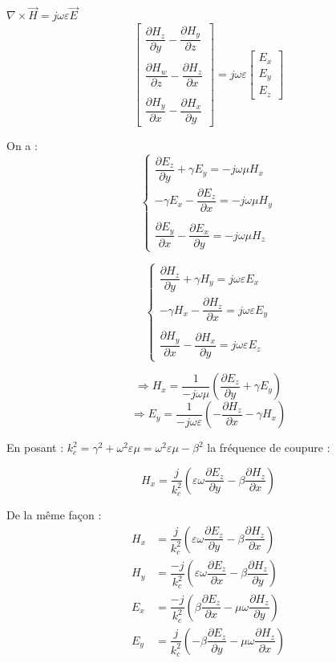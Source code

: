 \documentclass[12pt,a4paper]{report}
\begin{document}
\(\nabla \times \vec{H} = j\omega \varepsilon \vec{E}\)
\[
	\left[
	\begin{array}{c}
		\dfrac{\partial H_z}{\partial y} - \dfrac{\partial H_y}{\partial z}\\\\
		\dfrac{\partial H_w}{\partial z} - \dfrac{\partial H_z}{\partial x}\\\\
		\dfrac{\partial H_y}{\partial x} - \dfrac{\partial H_x}{\partial y}
	\end{array}
	\right]
	= j\omega \varepsilon
	\left[
	\begin{array}{c}
		E_x\\
		E_y\\
		E_z
	\end{array}
	 \right]
\]

On a :
\[
	\left\lbrace
		\begin{array}{c}	
			\dfrac{\partial E_z}{\partial y} + \gamma E_y = -j\omega \mu H_x\\
			-\gamma E_x - \dfrac{\partial E_z}{\partial x} = -j\omega \mu H_y\\\\
			\dfrac{\partial E_y}{\partial x} - \dfrac{\partial E_x}{\partial y} = -j\omega \mu H_z
		\end{array}
	\right.
\]

\[
	\left\lbrace
		\begin{array}{c}	
			\dfrac{\partial H_z}{\partial y} + \gamma H_y = j\omega \varepsilon E_x\\
			-\gamma H_x - \dfrac{\partial H_z}{\partial x} = j\omega \varepsilon E_y\\\\
			\dfrac{\partial H_y}{\partial x} - \dfrac{\partial H_x}{\partial y} = j\omega \varepsilon E_z
		\end{array}
	\right.
\]

\[
	\Rightarrow H_x = \dfrac{1}{-j\omega \mu} \left( \dfrac{\partial E_z}{\partial y} + \gamma E_y \right)
\]
\[
	\Rightarrow E_y = \dfrac{1}{-j\omega \varepsilon} \left( -\dfrac{\partial H_z}{\partial x} - \gamma H_x \right)
\]

En posant : \(k_c^2 = \gamma^2 + \omega^2 \varepsilon \mu = \omega^2 \varepsilon \mu - \beta^2\) la fréquence de coupure :

\[
	H_x = \dfrac{j}{k_c^2}\left( \varepsilon \omega \dfrac{\partial E_z}{\partial y} - \beta \dfrac{\partial H_z}{\partial x} \right)
\]

De la même façon :
\begin{align*}
	H_x &= \dfrac{j}{k_c^2}\left( \varepsilon \omega \dfrac{\partial E_z}{\partial y} - \beta \dfrac{\partial H_z}{\partial x} \right)\\
	H_y &= \dfrac{-j}{k_c^2}\left( \varepsilon \omega \dfrac{\partial E_z}{\partial x} - \beta \dfrac{\partial H_z}{\partial y} \right)\\
	E_x &= \dfrac{-j}{k_c^2}\left( \beta \dfrac{\partial E_z}{\partial x} - \mu \omega \dfrac{\partial H_z}{\partial y} \right)\\
	E_y &= \dfrac{j}{k_c^2}\left( - \beta \dfrac{\partial E_z}{\partial y} - \mu \omega \dfrac{\partial H_z}{\partial x} \right)
\end{align*}
\end{document}
